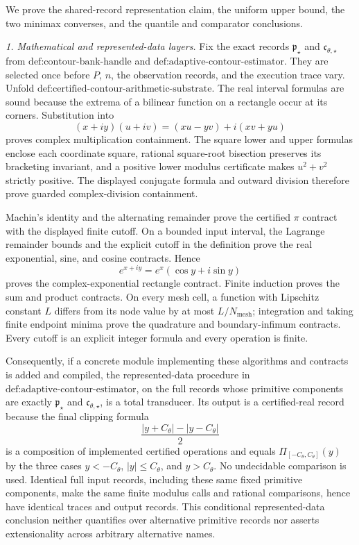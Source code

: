 We prove the shared-record representation claim, the uniform upper bound, the two minimax converses, and the quantile and comparator conclusions.

\emph{1. Mathematical and represented-data layers.}  Fix the exact records \(\mathfrak p_{\star}\) and \(\mathfrak c_{\theta,\star}\) from \(\text{def:contour-bank-handle}\) and \(\text{def:adaptive-contour-estimator}\).  They are selected once before \(P\), \(n\), the observation records, and the execution trace vary.  Unfold \(\text{def:certified-contour-arithmetic-substrate}\).  The real interval formulas are sound because the extrema of a bilinear function on a rectangle occur at its corners.  Substitution into
\[
 (x+iy)(u+iv)=(xu-yv)+i(xv+yu)
\]
proves complex multiplication containment.  The square lower and upper formulas enclose each coordinate square, rational square-root bisection preserves its bracketing invariant, and a positive lower modulus certificate makes \(u^2+v^2\) strictly positive.  The displayed conjugate formula and outward division therefore prove guarded complex-division containment.

Machin's identity and the alternating remainder prove the certified \(\pi\) contract with the displayed finite cutoff.  On a bounded input interval, the Lagrange remainder bounds and the explicit cutoff in the definition prove the real exponential, sine, and cosine contracts.  Hence
\[
 e^{x+iy}=e^x(\cos y+i\sin y)
\]
proves the complex-exponential rectangle contract.  Finite induction proves the sum and product contracts.  On every mesh cell, a function with Lipschitz constant \(L\) differs from its node value by at most \(L/N_{\mathrm{mesh}}\); integration and taking finite endpoint minima prove the quadrature and boundary-infimum contracts.  Every cutoff is an explicit integer formula and every operation is finite.

Consequently, if a concrete module implementing these algorithms and contracts is added and compiled, the represented-data procedure in \(\text{def:adaptive-contour-estimator}\), on the full records whose primitive components are exactly \(\mathfrak p_{\star}\) and \(\mathfrak c_{\theta,\star}\), is a total transducer.  Its output is a certified-real record because the final clipping formula
\[
 \frac{|y+C_{\theta}|-|y-C_{\theta}|}{2}
\]
is a composition of implemented certified operations and equals \(\Pi_{[-C_{\theta},C_{\theta}]}(y)\) by the three cases \(y<-C_{\theta}\), \(|y|\le C_{\theta}\), and \(y>C_{\theta}\).  No undecidable comparison is used.  Identical full input records, including these same fixed primitive components, make the same finite modulus calls and rational comparisons, hence have identical traces and output records.  This conditional represented-data conclusion neither quantifies over alternative primitive records nor asserts extensionality across arbitrary alternative names.

